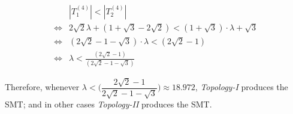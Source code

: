 \begin{align*}
    & |T^{(4)}_1| < |T^{(4)}_2| \\ 
    \Longleftrightarrow & 2 \sqrt{2} \lambda + (1 + \sqrt{3} - 2 \sqrt{2}) < (1 + \sqrt{3}) \cdot \lambda + \sqrt{3} \\ 
    \Longleftrightarrow & (2 \sqrt{2} - 1 - \sqrt{3}) \cdot \lambda <  (2 \sqrt{2} - 1) \\ 
    \Longleftrightarrow & \lambda <  \frac{(2 \sqrt{2} - 1)}{(2 \sqrt{2} - 1 - \sqrt{3})}
\end{align*}

Therefore, whenever $\lambda <  \Bigg( \dfrac{2 \sqrt{2} - 1}{2 \sqrt{2} - 1 - \sqrt{3}} \Bigg) \approx 18.972$, \emph{Topology-I} produces the SMT; and in other cases \emph{Topology-II} produces the SMT.

